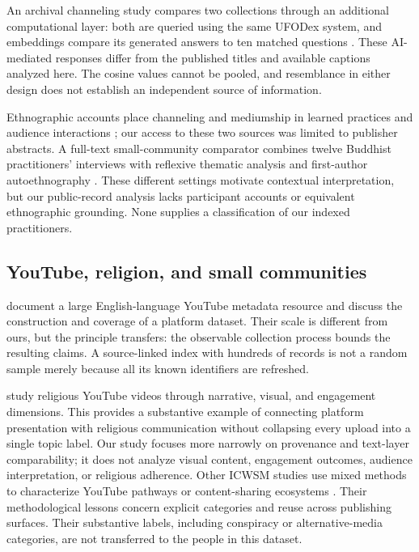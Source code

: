 An archival channeling study compares two collections through an additional computational layer: both are queried using the same UFODex system, and embeddings compare its generated answers to ten matched questions \citep{wahbeh2026records}. These AI-mediated responses differ from the published titles and available captions analyzed here. The cosine values cannot be pooled, and resemblance in either design does not establish an independent source of information.

Ethnographic accounts place channeling and mediumship in learned practices and audience interactions \citep{klinoron2014channel,tomlinson2019medium}; our access to these two sources was limited to publisher abstracts. A full-text small-community comparator combines twelve Buddhist practitioners' interviews with reflexive thematic analysis and first-author autoethnography \citep{claisse2023faith}. These different settings motivate contextual interpretation, but our public-record analysis lacks participant accounts or equivalent ethnographic grounding. None supplies a classification of our indexed practitioners.

\subsection{YouTube, religion, and small communities}
\citet{ribeiro2021youniverse} document a large English-language YouTube metadata resource and discuss the construction and coverage of a platform dataset. Their scale is different from ours, but the principle transfers: the observable collection process bounds the resulting claims. A source-linked index with hundreds of records is not a random sample merely because all its known identifiers are refreshed.

\citet{chen2026digital} study religious YouTube videos through narrative, visual, and engagement dimensions. This provides a substantive example of connecting platform presentation with religious communication without collapsing every upload into a single topic label. Our study focuses more narrowly on provenance and text-layer comparability; it does not analyze visual content, engagement outcomes, audience interpretation, or religious adherence. Other ICWSM studies use mixed methods to characterize YouTube pathways or content-sharing ecosystems \citep{ota2025pathways,starbird2018ecosystem}. Their methodological lessons concern explicit categories and reuse across publishing surfaces. Their substantive labels, including conspiracy or alternative-media categories, are not transferred to the people in this dataset.

